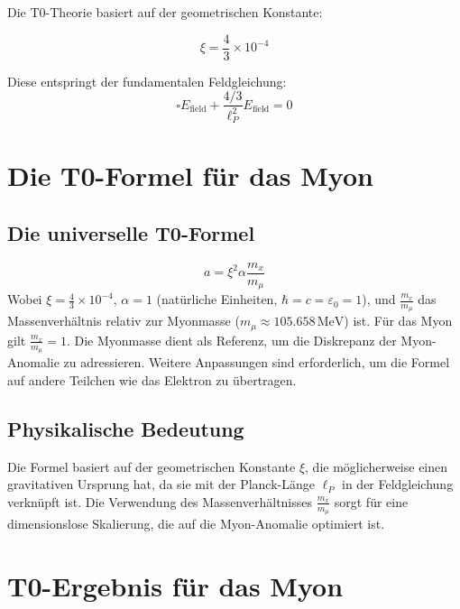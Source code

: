\documentclass[12pt,a4paper]{article}
\newcommand{\xipar}{\xi}
\begin{document}
	Die T0-Theorie basiert auf der geometrischen Konstante:
	
	\begin{formel}
		\begin{equation}
			\xipar = \frac{4}{3} \times 10^{-4}
		\end{equation}
	\end{formel}
	
	Diese entspringt der fundamentalen Feldgleichung:
	\begin{equation}
		\square E_{\text{field}} + \frac{4/3}{\ell_P^2} E_{\text{field}} = 0
	\end{equation}
	
	\section{Die T0-Formel für das Myon}
	
	\subsection{Die universelle T0-Formel}
	
	\begin{formel}
		\begin{equation}
			a = \xipar^2 \alpha \frac{m_x}{m_\mu}
		\end{equation}
		Wobei \(\xipar = \frac{4}{3} \times 10^{-4}\), \(\alpha = 1\) (natürliche Einheiten, \(\hbar = c = \varepsilon_0 = 1\)), und \(\frac{m_x}{m_\mu}\) das Massenverhältnis relativ zur Myonmasse (\(m_\mu \approx 105.658 \, \text{MeV}\)) ist. Für das Myon gilt \(\frac{m_x}{m_\mu} = 1\). Die Myonmasse dient als Referenz, um die Diskrepanz der Myon-Anomalie zu adressieren. Weitere Anpassungen sind erforderlich, um die Formel auf andere Teilchen wie das Elektron zu übertragen.
	\end{formel}
	
	\subsection{Physikalische Bedeutung}
	
	Die Formel basiert auf der geometrischen Konstante \(\xipar\), die möglicherweise einen gravitativen Ursprung hat, da sie mit der Planck-Länge \(\ell_P\) in der Feldgleichung verknüpft ist. Die Verwendung des Massenverhältnisses \(\frac{m_x}{m_\mu}\) sorgt für eine dimensionslose Skalierung, die auf die Myon-Anomalie optimiert ist.
	
	\section{T0-Ergebnis für das Myon}
	
\end{document}
